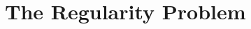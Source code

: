 \section{The Regularity Problem}\label{sec:TheRegularityProblem}

\begingroup
\renewcommand{\theequation}{\thesection.\arabic{equation}}
\renewcommand{\theHequation}{\thesection.\arabic{equation}}

\endgroup
